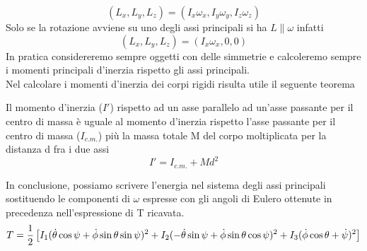 \documentclass[
10pt, %
a4paper, %
oneside, %
headinclude,footinclude, %
BCOR5mm, %
]{scrartcl}
\begin{document}
\[(L_x, L_y, L_z) = (I_x\omega_x, I_y\omega_y, I_z\omega_z)\]
Solo se la rotazione avviene su uno degli assi principali si ha \(L \parallel \omega \) infatti
\[(L_x, L_y, L_z) = (I_x\omega_x, 0, 0)\]
In pratica considereremo sempre oggetti con delle simmetrie e calcoleremo sempre i momenti principali d'inerzia rispetto gli assi principali.\\
Nel calcolare i momenti d'inerzia dei corpi rigidi risulta utile il seguente teorema
\begin{teorema}
	Il momento d'inerzia (\(I'\)) rispetto ad un asse parallelo ad un'asse passante per il centro di massa è uguale al momento d'inerzia rispetto l'asse passante per il centro di massa (\(I_{c.m.}\)) più la massa totale M del corpo moltiplicata per la distanza d fra i due assi
	\[I' = I_{c.m.} + Md^2\] 
\end{teorema}
In conclusione, possiamo scrivere l'energia nel sistema degli assi principali sostituendo le componenti di $\omega$ espresse con gli angoli di Eulero ottenute in precedenza nell'espressione di T ricavata.
\[T = \frac{1}{2}\left[I_1(\dot{\theta}\cos\psi+\dot{\phi}\sin\theta\sin\psi)^2+
I_2(-\dot{\theta}\sin\psi+\dot{\phi}\sin\theta\cos\psi)^2+\\
I_3(\dot{\phi}\cos\theta+\dot{\psi})^2\right]\]
\end{document}
